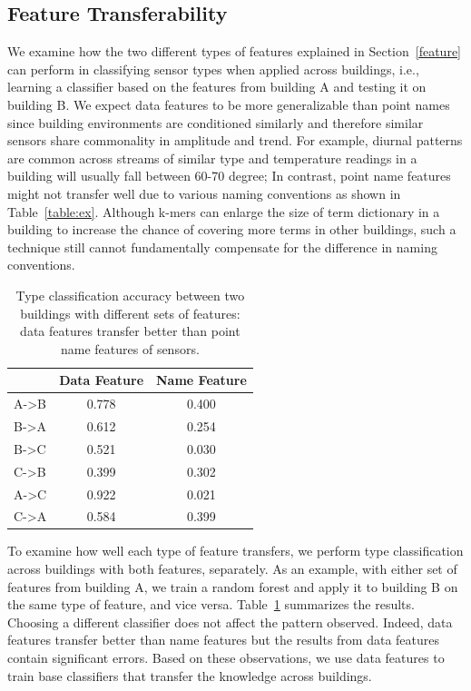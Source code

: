 \subsection{Feature Transferability}
We examine how the two different types of features explained in Section~\ref{feature} can perform in classifying sensor types when applied across buildings, i.e., learning a classifier based on the features from building A and testing it on building B. 
We expect data features to be more generalizable than point names since 
building environments are conditioned similarly and therefore similar sensors 
share commonality in amplitude and trend.
For example, diurnal patterns are common across streams of similar type and 
temperature readings in a building will usually fall between 60-70 degree; 
In contrast, point name features might not transfer well due to various naming conventions as shown in Table~\ref{table:ex}.
Although k-mers can enlarge the size of term dictionary in a building to increase the chance of covering more terms in other buildings, such a technique still cannot fundamentally compensate for the difference in naming conventions.


\begin{table}[h]
\centering
\begin{tabular}{l|c|c}
\hline
                & Data Feature & Name Feature \\ \hline\hline
A-\textgreater B & 0.778       & 0.400       \\
B-\textgreater A & 0.612       & 0.254       \\ \hline
B-\textgreater C & 0.521       & 0.030       \\
C-\textgreater B & 0.399       & 0.302       \\ \hline
A-\textgreater C & 0.922       & 0.021       \\
C-\textgreater A & 0.584       & 0.399       \\ \hline
\end{tabular}
\caption{Type classification accuracy between two buildings with different sets of features: data features transfer better than point name features of sensors.}
\label{table:clf}
\end{table}


To examine how well each type of feature transfers, we perform type classification across buildings with both features, separately.   
As an example, with either set of features from building A, we train a random forest and apply it to building B on the same type of feature, and vice versa. 
Table~\ref{table:clf} summarizes the results. Choosing a different classifier does not affect the pattern observed.
Indeed, data features transfer better than name features but the results from data features contain significant errors. 
Based on these observations, we use data features to train base classifiers that transfer the knowledge across buildings.

